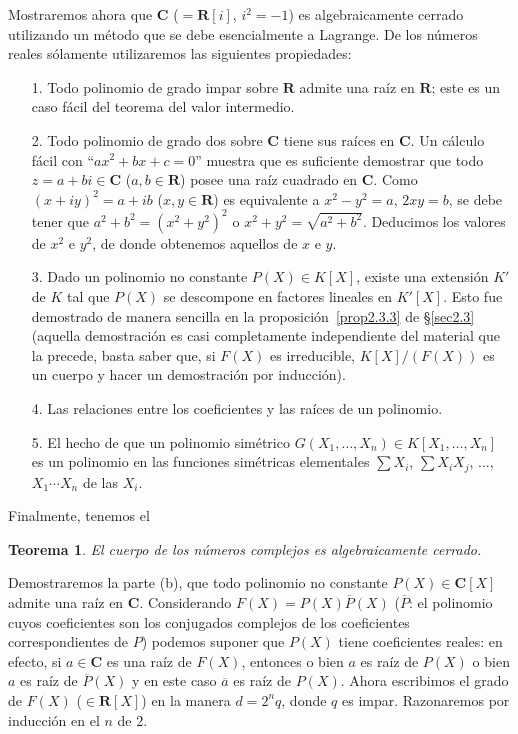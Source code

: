 \documentclass[bibtotoc,leqno,spanish]{amsbook}
\let\emph\relax %
\newcommand{\RR}{\mathbf{R}}
\newcommand{\CC}{\mathbf{C}}
\newcommand{\oline}[1]{\overline{#1}}
\numberwithin{equation}{section}
\theoremstyle{note}
\theoremstyle{note}
\newtheorem*{theorem*}{Teorema}
\theoremstyle{rem}
\numberwithin{theorem}{section}
\numberwithin{proposition}{section}
\numberwithin{definition}{section}
\numberwithin{lemma}{section}
\numberwithin{corollary}{section}
\numberwithin{example}{section}
\numberwithin{footnote}{section}%
\begin{document}
Mostraremos ahora que $\CC$ ($=\RR[i]$, $i^{2}=-1$) es algebraicamente cerrado utilizando un m\'etodo
que se debe esencialmente a Lagrange. De los n\'umeros reales s\'olamente utilizaremos
las siguientes propiedades:
\begin{enumerate}
\item[1.] Todo polinomio de grado impar sobre $\RR$ admite una ra\'iz en $\RR$; este es un caso f\'acil del teorema
del valor intermedio.
\item[2.] Todo polinomio de grado dos sobre $\CC$ tiene sus ra\'ices en $\CC$. Un c\'alculo f\'acil con
``$ax^{2}+bx+c=0$'' muestra que es suficiente demostrar que todo $z=a+bi\in\CC$ ($a,b\in\RR$) posee una
ra\'iz cuadrado en $\CC$. Como $(x+iy)^{2}=a+ib$ ($x,y\in\RR$) es equivalente a $x^{2}-y^{2}=a$,
$2xy = b$, se debe tener que $a^{2}+b^{2}=(x^{2}+y^{2})^{2}$ o $x^{2}+y^{2} = \sqrt{a^{2}+b^{2}}$. Deducimos
los valores de $x^{2}$ e $y^{2}$, de donde obtenemos aquellos de $x$ e $y$.
\item[3.] Dado un polinomio no constante $P(X)\in K[X]$, existe una extensi\'on $K'$ de $K$ tal que
$P(X)$ se descompone en factores lineales en $K'[X]$. Esto fue demostrado de manera sencilla en la
proposici\'on~\ref{prop2.3.3} de \S\ref{sec2.3} (aquella demostraci\'on es casi completamente independiente del material que la precede,
basta saber que, si $F(X)$ es irreducible, $K[X]/(F(X))$ es un cuerpo y hacer un demostraci\'on por inducci\'on).
\item[4.] Las relaciones entre los coeficientes y las ra\'ices de un polinomio.
\item[5.] El hecho de que un polinomio sim\'etrico $G(X_{1},\dots,X_{n})\in K[X_{1},\dots,X_{n}]$ es un polinomio
en las funciones sim\'etricas elementales $\sum X_{i}$, $\sum X_{i}X_{j}$, ..., $X_{1}\cdots X_{n}$ de las
$X_{i}$.
\end{enumerate}

Finalmente, tenemos el

\begin{theorem*}
El cuerpo de los n\'umeros complejos es algebraicamente cerrado.
\end{theorem*}

Demostraremos la parte (b), que todo polinomio no constante $P(X)\in\CC[X]$ admite una ra\'iz en
$\CC$. Considerando $F(X) = P(X)\oline P(X)$ ($\oline P$: el polinomio cuyos coeficientes son los
conjugados complejos de los coeficientes correspondientes de $P$) podemos suponer que $P(X)$ tiene
coeficientes reales: en efecto, si $a\in\CC$ es una ra\'iz de $F(X)$, entonces o bien $a$ es ra\'iz
de $P(X)$ o bien $a$ es ra\'iz de $\oline P(X)$ y en este caso $\oline a$ es ra\'iz de $P(X)$.
Ahora escribimos el grado de $F(X)$ ($\in\RR[X]$) en la manera $d = 2^{n}q$, donde $q$ es impar.
Razonaremos por inducci\'on en el \emph{exponente} $n$ de $2$.
\end{document}
